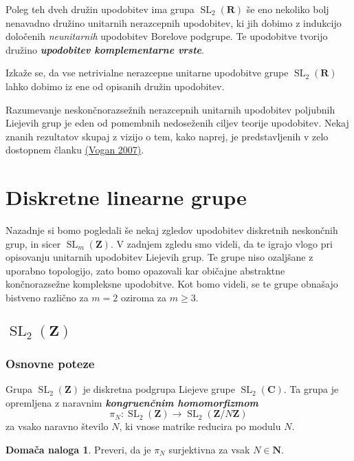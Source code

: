 \documentclass[11pt]{book}
\def\NN{\mathbf{N}}
\def\ZZ{\mathbf{Z}}
\def\RR{\mathbf{R}}
\def\CC{\mathbf{C}}
\DeclareMathOperator\SL{SL}
\def\definicija{\color{rdeca}\bf\em}
\theoremstyle{definition}
\theoremstyle{zgled}
\theoremstyle{odprtproblem}
\theoremstyle{domacanaloga}
\newtheorem*{domacanaloga}{Domača naloga}
\theoremstyle{izrek}
\begin{document}
Poleg teh dveh družin upodobitev ima grupa $\SL_2(\RR)$ še eno nekoliko bolj nenavadno družino unitarnih nerazcepnih upodobitev, ki jih dobimo z indukcijo določenih \emph{neunitarnih} upodobitev Borelove podgrupe. Te upodobitve tvorijo družino {\definicija upodobitev komplementarne vrste}.

Izkaže se, da vse netrivialne nerazcepne unitarne upodobitve grupe $\SL_2(\RR)$ lahko dobimo iz ene od opisanih družin upodobitev.

Razumevanje neskončnorazsežnih nerazcepnih unitarnih upodobitev poljubnih Liejevih grup je eden od pomembnih nedoseženih ciljev teorije upodobitev. Nekaj znanih rezultatov skupaj z vizijo o tem, kako naprej, je predstavljenih v zelo dostopnem članku \href{https://math.mit.edu/~dav/articleHIST.pdf}{(Vogan 2007)}.


\section{Diskretne linearne grupe}

Nazadnje si bomo pogledali še nekaj zgledov upodobitev diskretnih neskončnih grup, in sicer $\SL_m(\ZZ)$. V zadnjem zgledu smo videli, da te igrajo vlogo pri opisovanju unitarnih upodobitev Liejevih grup. Te grupe niso ozaljšane z uporabno topologijo, zato bomo opazovali kar običajne abstraktne končnorazsežne kompleksne upodobitve. Kot bomo videli, se te grupe obnašajo bistveno različno za $m = 2$ oziroma za $m \geq 3$.

\subsection{$\SL_2(\ZZ)$}

\subsubsection{Osnovne poteze}

Grupa $\SL_2(\ZZ)$ je diskretna podgrupa Liejeve grupe $\SL_2(\CC)$. Ta grupa je opremljena z naravnim {\definicija kongruenčnim homomorfizmom}
\[
    \textstyle \pi_N \colon \SL_2(\ZZ) \to \SL_2(\ZZ/N\ZZ)
\]
za vsako naravno število $N$, ki vnose matrike reducira po modulu $N$. 

\begin{domacanaloga}
Preveri, da je $\pi_N$ surjektivna za vsak $N \in \NN$.
\end{domacanaloga}
\end{document}
